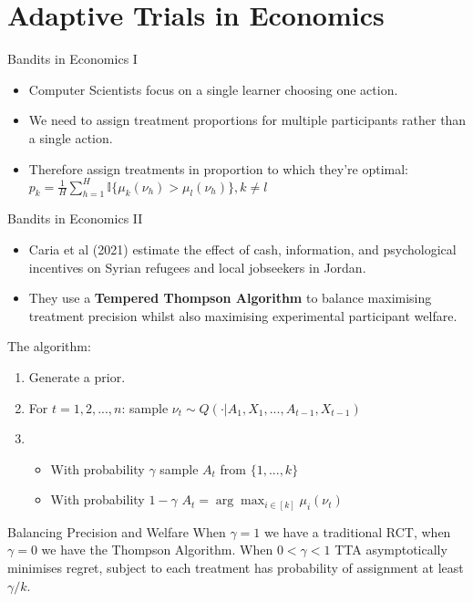 \documentclass[aspectratio=169,xcolor=dvipsnames]{beamer}
\begin{document}
\section*{Adaptive Trials in Economics}
\begin{frame}{Bandits in Economics I}
    \begin{itemize}
        \item Computer Scientists focus on a single learner choosing one action.
        \item We need to assign treatment proportions for multiple participants rather 
        than a single action.
        \item Therefore assign treatments in proportion to which they're optimal:
        $p_k = \frac{1}{H} \sum^H_{h=1} \mathbb{I}\{\mu_k(\nu_{h})  > \mu_l(\nu_{h}) \}, k \neq l$
    \end{itemize}
\end{frame}


\begin{frame}{Bandits in Economics II}


    \begin{itemize}
        \item Caria et al (2021) estimate the effect of cash, information, and psychological 
    incentives on Syrian refugees and local jobseekers in Jordan. 
        \item They use a \textbf{Tempered Thompson Algorithm} to balance maximising treatment 
    precision whilst also maximising experimental participant welfare.
    \end{itemize}

    The algorithm:

    \begin{enumerate}
        \item Generate a prior.
        \item For $t = 1,2,...,n$: sample $\nu_t \sim Q(\cdot | A_1, X_1, ..., A_{t-1}, X_{t-1})$
        \item \begin{itemize}
            \item With probability $\gamma$  sample $A_t$ from $\{1, ..., k\}$
            \item With probability $1 - \gamma$ $A_t = \arg\max_{i \in [k]} \mu_i(\nu_t)$
        \end{itemize} 
    \end{enumerate}

    \begin{exampleblock}{Balancing Precision and Welfare}
        When $\gamma = 1$ we have a traditional RCT, when $\gamma = 0$ we have the 
        Thompson Algorithm. 
        When $0 < \gamma < 1$ TTA asymptotically minimises regret, subject to  
        each treatment has probability of assignment at least $\gamma/k$.
    \end{exampleblock}
\end{frame}
\end{document}
